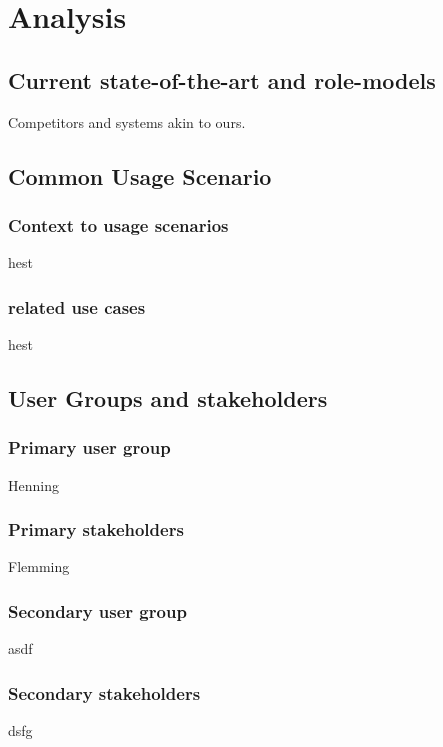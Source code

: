 \chapter{Analysis}
\section{Current state-of-the-art and role-models}
Competitors and systems akin to ours.

\section{Common Usage Scenario}
\subsection{Context to usage scenarios}
hest

\subsection{related use cases}
hest

\section{User Groups and stakeholders}
\subsection{Primary user group}
Henning

\subsection{Primary stakeholders}
Flemming

\subsection{Secondary user group}
asdf

\subsection{Secondary stakeholders}
dsfg
